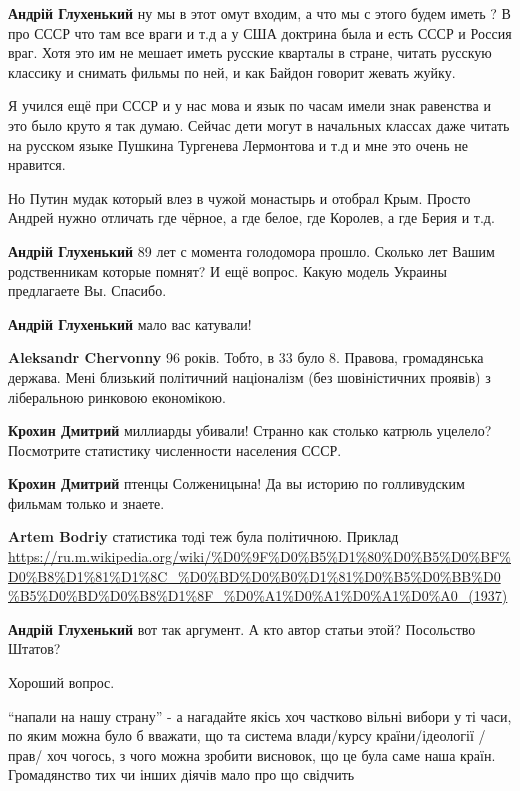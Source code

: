 \begin{itemize}
\begin{itemize}
\textbf{Андрій Глухенький} ну мы в этот омут входим, а что мы с этого будем
иметь ? В про СССР что там все враги и т.д а у США доктрина была и есть СССР и
Россия враг. Хотя это им не мешает иметь русские кварталы в стране, читать
русскую классику и снимать фильмы по ней, и как Байдон говорит жевать жуйку. 

Я учился ещё при СССР и у нас мова и язык по часам имели знак равенства и это
было круто я так думаю. Сейчас дети могут в начальных классах даже читать на
русском языке Пушкина Тургенева Лермонтова и т.д и мне это очень не нравится.

Но Путин мудак который влез в чужой монастырь и отобрал Крым. Просто Андрей
нужно отличать где чёрное, а где белое, где Королев, а где Берия и т.д.

\textbf{Андрій Глухенький} 89 лет с момента голодомора прошло. Сколько лет
Вашим родственникам которые помнят? И ещё вопрос. Какую модель Украины
предлагаете Вы. Спасибо.

\textbf{Андрій Глухенький} мало вас катували!


\textbf{Aleksandr Chervonny} 96 років. Тобто, в 33 було 8. Правова,
громадянська держава. Мені близький політичний націоналізм (без шовіністичних
проявів) з ліберальною ринковою економікою.

\textbf{Крохин Дмитрий} миллиарды убивали! Странно как столько катрюль уцелело?
Посмотрите статистику численности населения СССР.

\textbf{Крохин Дмитрий} птенцы Солженицына!
Да вы историю по голливудским фильмам только и знаете.

\textbf{Artem Bodriy} статистика тоді теж була політичною. Приклад
\url{https://ru.m.wikipedia.org/wiki/%D0%9F%D0%B5%D1%80%D0%B5%D0%BF%D0%B8%D1%81%D1%8C_%D0%BD%D0%B0%D1%81%D0%B5%D0%BB%D0%B5%D0%BD%D0%B8%D1%8F_%D0%A1%D0%A1%D0%A1%D0%A0_(1937)}

\textbf{Андрій Глухенький} вот так аргумент. А кто автор статьи этой?
Посольство Штатов?

Хороший вопрос.


\enquote{напали на нашу страну} - а нагадайте якісь хоч частково вільні вибори у ті
часи, по яким можна було б вважати, що та система влади/курсу країни/ідеології
/ прав/ хоч чогось, з чого можна зробити висновок, що це була саме наша країн.
Громадянство тих чи інших діячів мало про що свідчить


\end{itemize}
\end{itemize}
